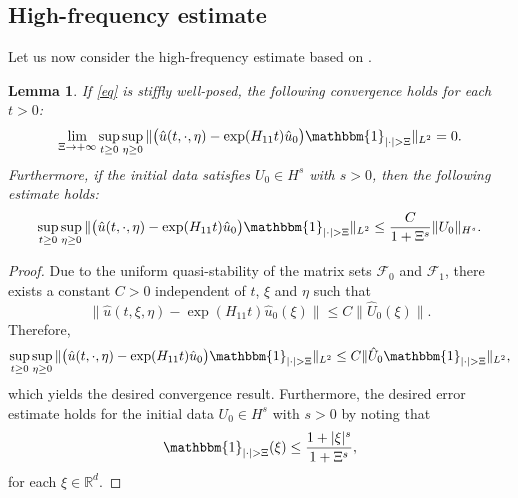 \documentclass{article}
\theoremstyle{plain}%
\newtheorem{lemma}{Lemma}%
\theoremstyle{definition}%
\theoremstyle{remark}%
\newcommand{\bR}{\mathbb{R}}
\newcommand{\cF}{\mathcal{F}}
\newcommand{\+}[1]{{\bm{#1}}}
\newcommand{\norm}[1]{\|{#1}\|}
\begin{document}
\subsection{High-frequency estimate}

Let us now consider the high-frequency estimate based on 
.

\begin{lemma}\label{lemma:high_frequency}
  If \cref{eq} is stiffly well-posed, the following convergence holds 
  for each $t > 0$: 
  \begin{displaymath}
    \lim_{\Xi \to +\infty} \sup_{t \ge 0} \sup_{\eta \ge 0}
    \norm{ \big( \hat{u}(t, \cdot, \eta) - \exp(H_{11} t) \hat{u}_0
    \big) \mathbbm{1}_{|\cdot| > \Xi} }_{L^2} = 0.
  \end{displaymath}
  Furthermore, if the initial data satisfies $U_0 \in H^s$ 
  with $s > 0$, then the following estimate holds:
  \begin{displaymath}
    \sup_{t \ge 0} \sup_{\eta \ge 0}
    \norm{ \big( \hat{u}(t, \cdot, \eta) - \exp(H_{11} t) \hat{u}_0
    \big) \mathbbm{1}_{|\cdot| > \Xi} }_{L^2} \le 
    \frac{C}{1 + \Xi^s} \|U_0\|_{H^s}.
  \end{displaymath}
\end{lemma}

\begin{proof}
  Due to the uniform quasi-stability of the matrix sets 
  $\cF_0$ and $\cF_1$, there exists a constant $C > 0$ independent of 
  $t$, $\xi$ and $\eta$ such that 
  \begin{displaymath}
    \|\hat{u}(t, \xi, \eta) - \exp(H_{11} t) \hat{u}_0(\xi)\| \le 
    C \|\hat{U}_0(\xi)\|.
  \end{displaymath}
  Therefore, 
  \begin{displaymath}
    \sup_{t \ge 0} \sup_{\eta \ge 0}
    \norm{ \big( \hat{u}(t, \cdot, \eta) - \exp(H_{11} t) \hat{u}_0
    \big) \mathbbm{1}_{|\cdot| > \Xi} }_{L^2} \le C 
    \| \hat{U}_0 \mathbbm{1}_{|\cdot| > \Xi} \|_{L^2},
  \end{displaymath}
  which yields the desired convergence result.
  Furthermore, the desired error estimate holds for the initial data 
  $U_0 \in H^s$ with $s > 0$ by noting that 
  \begin{displaymath}
    \mathbbm{1}_{|\cdot| > \Xi}(\xi) \le 
    \frac{1 + |\xi|^s}{1 + \Xi^s},
  \end{displaymath}
  for each $\xi \in \bR^d$.
\end{proof}
\end{document}

